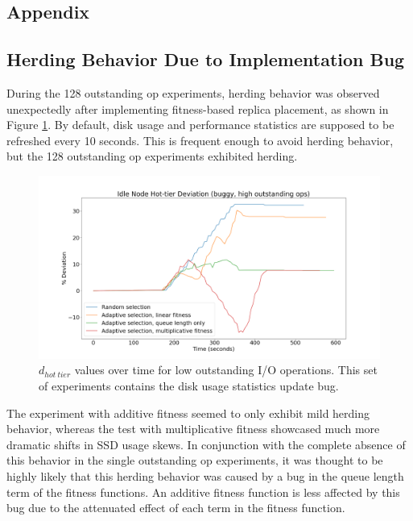 \documentclass[12pt]{article}
\begin{document}
\newpage
\null
\FloatBarrier
\begin{appendices}
\appendix
\section{Appendix}

  \subsection{Herding Behavior Due to Implementation Bug}

  During the 128 outstanding op experiments, herding behavior
  was observed unexpectedly after implementing fitness-based replica placement,
  as shown in Figure \ref{fig:herding_bug}. By default, disk usage and
  performance statistics are supposed to be refreshed every 10 seconds. This is
  frequent enough to avoid herding behavior, but the 128 outstanding op
  experiments exhibited herding.

  \begin{figure}[htbp]
    \centering
    \includegraphics[scale=0.30]{images/buggy.png} 
    \caption{$d_{hot\ tier}$ values over time for low outstanding I/O
             operations. This set of experiments contains the disk usage statistics update bug.}
    \label{fig:herding_bug}
  \end{figure}

  The experiment with additive fitness seemed to only exhibit mild herding
  behavior, whereas the test with multiplicative fitness showcased much more
  dramatic shifts in SSD usage skews. In conjunction with the complete absence
  of this behavior in the single outstanding op experiments, it was thought to
  be highly likely that this herding behavior was caused by a bug in the queue
  length term of the fitness functions. An additive fitness function is less
  affected by this bug due to the attenuated effect of each term in the fitness
  function.


\end{appendices}
\end{document}
